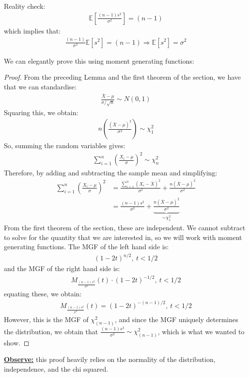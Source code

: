 \documentclass[11pt]{scrartcl}
\theoremstyle{definition}
\theoremstyle{remark}
\newcommand{\dfn}[1]{\textbf{\underline{#1}}}
\newcommand{\EX}[1]{\mathbb{E}\left[#1 \right]}
\begin{document}
Reality check: \begin{align*}
 	\EX{ \frac{(n-1)s^2}{\sigma^2}} = (n-1) 
 \end{align*}
 which implies that: 
 \begin{align*}
 	\frac{(n-1)}{\sigma^2} \EX{s^2} = (n-1) \Rightarrow \EX{s^2} = \sigma^2	
 \end{align*}

We can elegantly prove this using moment generating functions: 
\begin{proof}
	From the preceding Lemma and the first theorem of the section, we have that we can standardise: 
	\begin{align*}
		\frac{\overline{X} - \mu}{\sigma / \sqrt{n} }	\sim N(0,1) 
	\end{align*}
	Squaring this, we obtain: 
	\begin{align*}
		n \left( 	\frac{(\overline{X} - \mu)^2}{\sigma^2}		\right) \sim \chi^2_1 	
	\end{align*}
	So, summing the random variables gives: 
	\begin{align*}
		\sum_{i=1}^n \left( 		\frac{X_i - \mu}{\sigma}	\right)^2 	\sim \chi_n^2
	\end{align*}
	 Therefore, by adding and subtracting the sample mean and simplifying: 
	 \begin{align*}
	 \sum_{i=1}^n \left( 		\frac{X_i - \mu}{\sigma}	\right)^2 &  = \frac{\sum_{i=1}^n (X_i - \overline{X})^2}{\sigma^2	} + \frac{n (\overline{X} - \mu)^2}{\sigma^2}	\\
	 	& = \frac{(n-1)s^2}{\sigma^2	} + \underbrace{\frac{n(\overline{X} - \mu)^2}{\sigma^2}}_{ \sim \chi_1^2} 
	 \end{align*}
		From the first theorem of the section, these are independent. We cannot subtract to solve for the quantity that we are interested in, so we will work with moment generating functions. The MGF of the left hand side is: 
		\begin{align*}
			(1 - 2t)^{n/2},\ t < 1/2	
		\end{align*}
		and the MGF of the right hand side is: 
		\begin{align*}
			M_{\frac{(n-1)s^2}{\sigma^2}} (t)  \cdot (1-2t)^{-1/2},\ t < 1/2 
		\end{align*}
		equating these, we obtain: 
		\begin{align*}
			M_{\frac{(n-1)s^2}{\sigma^2}} (t) 	= (1-2t)^{-(n-1)/2},\ t < 1/2
		\end{align*}
		However, this is the MGF of $\chi_{(n-1)}^2$, and since the MGF uniquely determines the distribution, we obtain that $\frac{(n-1)s^2}{\sigma^2} \sim \chi^2_{(n-1)}$, which is what we wanted to show. 
\end{proof}
\dfn{Observe:} this proof heavily relies on the normality of the distribution, independence, and the chi squared. 
\end{document}
